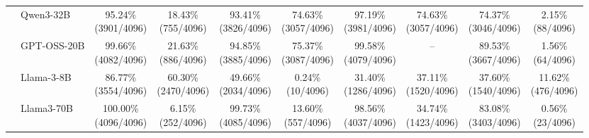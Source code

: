 \begin{table}[t]
{\begin{tabular}{ll*{8}{c}}
 & Qwen3-32B & \makecell[c]{95.24\%\\[-1pt]\scriptsize(3901/4096)} & \makecell[c]{18.43\%\\[-1pt]\scriptsize(755/4096)} & \makecell[c]{93.41\%\\[-1pt]\scriptsize(3826/4096)} & \makecell[c]{74.63\%\\[-1pt]\scriptsize(3057/4096)} & \makecell[c]{97.19\%\\[-1pt]\scriptsize(3981/4096)} & \makecell[c]{74.63\%\\[-1pt]\scriptsize(3057/4096)} & \makecell[c]{74.37\%\\[-1pt]\scriptsize(3046/4096)} & \makecell[c]{2.15\%\\[-1pt]\scriptsize(88/4096)} \\
 & GPT-OSS-20B & \makecell[c]{99.66\%\\[-1pt]\scriptsize(4082/4096)} & \makecell[c]{21.63\%\\[-1pt]\scriptsize(886/4096)} & \makecell[c]{94.85\%\\[-1pt]\scriptsize(3885/4096)} & \makecell[c]{75.37\%\\[-1pt]\scriptsize(3087/4096)} & \makecell[c]{99.58\%\\[-1pt]\scriptsize(4079/4096)} & -- & \makecell[c]{89.53\%\\[-1pt]\scriptsize(3667/4096)} & \makecell[c]{1.56\%\\[-1pt]\scriptsize(64/4096)} \\
 & Llama-3-8B & \makecell[c]{86.77\%\\[-1pt]\scriptsize(3554/4096)} & \makecell[c]{60.30\%\\[-1pt]\scriptsize(2470/4096)} & \makecell[c]{49.66\%\\[-1pt]\scriptsize(2034/4096)} & \makecell[c]{0.24\%\\[-1pt]\scriptsize(10/4096)} & \makecell[c]{31.40\%\\[-1pt]\scriptsize(1286/4096)} & \makecell[c]{37.11\%\\[-1pt]\scriptsize(1520/4096)} & \makecell[c]{37.60\%\\[-1pt]\scriptsize(1540/4096)} & \makecell[c]{11.62\%\\[-1pt]\scriptsize(476/4096)} \\
 & Llama3-70B & \makecell[c]{100.00\%\\[-1pt]\scriptsize(4096/4096)} & \makecell[c]{6.15\%\\[-1pt]\scriptsize(252/4096)} & \makecell[c]{99.73\%\\[-1pt]\scriptsize(4085/4096)} & \makecell[c]{13.60\%\\[-1pt]\scriptsize(557/4096)} & \makecell[c]{98.56\%\\[-1pt]\scriptsize(4037/4096)} & \makecell[c]{34.74\%\\[-1pt]\scriptsize(1423/4096)} & \makecell[c]{83.08\%\\[-1pt]\scriptsize(3403/4096)} & \makecell[c]{0.56\%\\[-1pt]\scriptsize(23/4096)} \\

\end{tabular}}
\end{table}
